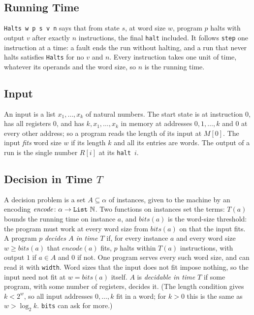 \documentclass[11pt]{article}
\newcommand{\leanitem}[1]{\leansep\def\leansep{\vspace{2pt}}}
\newcommand{\leansnippet}[1]{\begin{leanbox}\def\leansep{}\let\do\leanitem\docsvlist{#1}\end{leanbox}}
\newcommand{\N}{\mathbb N}
\newcommand{\lean}[1]{\texttt{#1}}
\begin{document}
\leansnippet{State,Outcome,step}

\subsection{Running Time}

\lean{Halts w p s v n} says that from state $s$, at word size $w$, program $p$ halts with
output $v$ after exactly $n$ instructions, the final \lean{halt} included.
It follows \lean{step} one instruction at a time: a fault ends the run without halting, and
a run that never halts satisfies \lean{Halts} for no $v$ and $n$.
Every instruction takes one unit of time, whatever its operands and the word size, so $n$ is
the running time.

\leansnippet{Halts}

\subsection{Input}\label{sec:lean-input}

An input is a list $x_1,\dots,x_k$ of natural numbers.
The start state is at instruction $0$, has all registers $0$, and has $k,x_1,\dots,x_k$ in
memory at addresses $0,1,\dots,k$ and $0$ at every other address;
so a program reads the length of its input at $M[0]$.
The input \emph{fits} word size $w$ if its length $k$ and all its entries are words.
The output of a run is the single number $R[i]$ at its \lean{halt}~$i$.

\leansnippet{init,InputFits}

\subsection{Decision in Time \texorpdfstring{$T$}{T}}

A decision problem is a set $A\subseteq\alpha$ of instances, given to the machine by an
encoding $\mathit{encode}\colon\alpha\to\text{\lean{List}}~\N$.
Two functions on instances set the terms: $T(a)$ bounds the running time on instance $a$,
and $\mathit{bits}(a)$ is the word-size threshold: the program must work at every word size
from $\mathit{bits}(a)$ on that the input fits.
A program $p$ \emph{decides $A$ in time $T$} if, for every instance $a$ and every word size
$w\ge \mathit{bits}(a)$ that $\mathit{encode}(a)$ fits, $p$ halts within $T(a)$ instructions,
with output $1$ if $a\in A$ and $0$ if not.
One program serves every such word size, and can read it with \lean{width}.
Word sizes that the input does not fit impose nothing, so the input need not fit at
$w=\mathit{bits}(a)$ itself.
$A$ is \emph{decidable in time $T$} if some program, with some number of registers, decides it.
(The length condition gives $k<2^w$, so all input addresses $0,\dots,k$ fit in a word; for
$k>0$ this is the same as $w>\log_2 k$. \lean{bits} can ask for more.)
\end{document}
